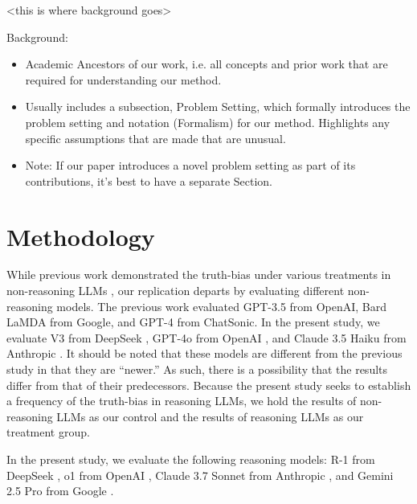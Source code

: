 \documentclass{article}
\begin{document}
<this is where background goes>

Background:
\begin{itemize}
    \item Academic Ancestors of our work, i.e. all concepts and prior work that are required for understanding our method. 
    \item Usually includes a subsection, Problem Setting, which formally introduces the problem setting and notation (Formalism) for our method. Highlights any specific assumptions that are made that are unusual. 
    \item Note: If our paper introduces a novel problem setting as part of its contributions, it’s best to have a separate Section.
\end{itemize}


\section{Methodology}

While previous work demonstrated the truth-bias under various treatments in non-reasoning LLMs \citep{markowitz_generative_2024}, our replication departs by evaluating different non-reasoning models. The previous work evaluated GPT-3.5 from OpenAI, Bard LaMDA from Google, and GPT-4 from ChatSonic. In the present study, we evaluate V3 from DeepSeek \citep{deepseekai2025deepseekv3technicalreport}, GPT-4o from OpenAI \citep{openai2024gpt4ocard}, and Claude 3.5 Haiku from Anthropic \citep{anthropic_claude_2024}. It should be noted that these models are different from the previous study in that they are ``newer.'' As such, there is a possibility that the results differ from that of their predecessors. Because the present study seeks to establish a frequency of the truth-bias in reasoning LLMs, we hold the results of non-reasoning LLMs as our control and the results of reasoning LLMs as our treatment group.


In the present study, we evaluate the following reasoning models: R-1 from DeepSeek \citep{deepseek-ai_deepseek-r1_2025}, o1 from OpenAI \citep{openai_openai_2024}, Claude 3.7 Sonnet from Anthropic \citep{anthropic_claude_2025}, and Gemini 2.5 Pro from Google \citep{deepmindGemini}.
\end{document}
